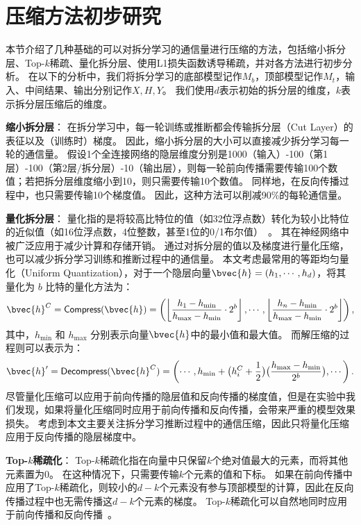 \section{压缩方法初步研究}
本节介绍了几种基础的可以对拆分学习的通信量进行压缩的方法，包括缩小拆分层、Top-$k$稀疏、量化拆分层、使用L1损失函数诱导稀疏，并对各方法进行初步分析。
%
在以下的分析中，我们将拆分学习的底部模型记作$M_b$，顶部模型记作$M_t$，输入、中间结果、输出分别记作$X, H, Y$。
我们使用$d$表示初始的拆分层的维度，$k$表示拆分层压缩后的维度。


\textbf{缩小拆分层}：
在拆分学习中，每一轮训练或推断都会传输拆分层（Cut Layer）的表征以及（训练时）梯度。
%
因此，缩小拆分层的大小可以直接减少拆分学习每一轮的通信量。
%
假设1个全连接网络的隐层维度分别是1000（输入）-100（第1层）-100（第2层/拆分层）-10（输出层），则每一轮前向传播需要传输100个数值；若把拆分层维度缩小到10，则只需要传输10个数值。
%
同样地，在反向传播过程中，也只需要传输10个梯度值。
%
因此，这种方法可以削减90\%的每轮通信量。

\textbf{量化拆分层}：
量化指的是将较高比特位的值（如32位浮点数）转化为较小比特位的近似值（如16位浮点数，4位整数，甚至1位的0/1布尔值）~\cite{zhou2016dorefa,banner2018_8bit,yang2019quantization}。
%
其在神经网络中被广泛应用于减少计算和存储开销。
%
通过对拆分层的值以及梯度进行量化压缩，也可以减少拆分学习训练和推断过程中的通信量。
%
本文考虑最常用的等距均匀量化（Uniform Quantization），对于一个隐层向量$\bvec{h} = (h_1, \cdots, h_d)$，将其量化为 $b$ 比特的量化方法为：
\begin{equation}
    \bvec{h}^C = \mathsf{Compress}(\bvec{h}) = \left( \left\lfloor \dfrac{h_1 - h_\text{min}}{h_\text{max} - h_\text{min}} \cdot  2^b \right\rfloor, \cdots, \left\lfloor \dfrac{h_n - h_\text{min}}{h_\text{max} - h_\text{min}} \cdot 2^b \right\rfloor \right),
\end{equation}
其中，$h_\text{min}$ 和 $h_\text{max}$ 分别表示向量$\bvec{h}$中的最小值和最大值。
%
而解压缩的过程则可以表示为：
\begin{equation}
    \bvec{h}' = \mathsf{Decompress}(\bvec{h}^C) = \left(\cdots, h_\text{min} + \big(h^C_i + \dfrac12 \big) \big(\dfrac{h_\text{max} - h_\text{min}}{2^b}\big), \cdots \right).
\end{equation}
% 
尽管量化压缩可以应用于前向传播的隐层值和反向传播的梯度值，但是在实验中我们发现，如果将量化压缩同时应用于前向传播和反向传播，会带来严重的模型效果损失。
%
考虑到本文主要关注拆分学习推断过程中的通信压缩，因此只将量化压缩应用于反向传播的隐层梯度中。

\textbf{Top-$k$稀疏化}：
Top-$k$稀疏化指在向量中只保留$k$个绝对值最大的元素，而将其他元素置为0。
%
在这种情况下，只需要传输$k$个元素的值和下标。
%
如果在前向传播中应用了Top-$k$稀疏化，则较小的$d-k$个元素没有参与顶部模型的计算，因此在反向传播过程中也无需传播这$d-k$个元素的梯度。
%
Top-$k$稀疏化可以自然地同时应用于前向传播和反向传播~\cite{jayakumar_2020_topkast}。
%

